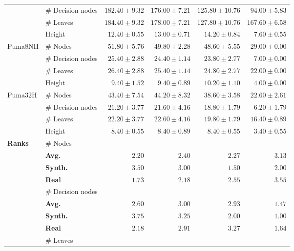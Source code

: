 \begin{table*}[!htbp]
{\begin{tabular}{llrrrr}
		  & \# Decision nodes & $182.40 \pm 9.32$ & $176.00 \pm 7.21$ & $125.80 \pm 10.76$ & $\mathbf{94.00 \pm 5.83}$\\
		  & \# Leaves & $184.40 \pm 9.32$ & $178.00 \pm 7.21$ & $\mathbf{127.80 \pm 10.76}$ & $167.60 \pm 6.58$\\
		  & Height & $12.40 \pm 0.55$ & $13.00 \pm 0.71$ & $14.20 \pm 0.84$ & $\mathbf{7.60 \pm 0.55}$\\
		\midrule
		\multirow{4}{*}{Puma8NH} & \# Nodes & $51.80 \pm 5.76$ & $49.80 \pm 2.28$ & $48.60 \pm 5.55$ & $\mathbf{29.00 \pm 0.00}$\\
		  & \# Decision nodes & $25.40 \pm 2.88$ & $24.40 \pm 1.14$ & $23.80 \pm 2.77$ & $\mathbf{7.00 \pm 0.00}$\\
		  & \# Leaves & $26.40 \pm 2.88$ & $25.40 \pm 1.14$ & $24.80 \pm 2.77$ & $\mathbf{22.00 \pm 0.00}$\\
		  & Height & $9.40 \pm 1.52$ & $9.40 \pm 0.89$ & $10.20 \pm 1.10$ & $\mathbf{4.00 \pm 0.00}$\\
		\midrule
		\multirow{4}{*}{Puma32H} & \# Nodes & $43.40 \pm 7.54$ & $44.20 \pm 8.32$ & $38.60 \pm 3.58$ & $\mathbf{22.60 \pm 2.61}$\\
		  & \# Decision nodes & $21.20 \pm 3.77$ & $21.60 \pm 4.16$ & $18.80 \pm 1.79$ & $\mathbf{6.20 \pm 1.79}$\\
		  & \# Leaves & $22.20 \pm 3.77$ & $22.60 \pm 4.16$ & $19.80 \pm 1.79$ & $\mathbf{16.40 \pm 0.89}$\\
		  & Height & $8.40 \pm 0.55$ & $8.40 \pm 0.89$ & $8.40 \pm 0.55$ & $\mathbf{3.40 \pm 0.55}$\\
		\midrule
		\multirow{16}{*}{\textbf{Ranks}}		 & \# Nodes &  &  &  & \\
		 & \qquad\textbf{Avg.} & $\mathbf{2.20}$ & $2.40$ & $2.27$ & $3.13$\\
		 & \qquad\textbf{Synth.} &  $3.50$ &  $3.00$ &  $\mathbf{1.50}$ &  $2.00$\\
		 & \qquad\textbf{Real} &  $\mathbf{1.73}$ & $2.18$ & $2.55$ & $3.55$\\
		\cmidrule{2-6}
		 & \# Decision nodes &  &  &  & \\
		 & \qquad\textbf{Avg.} & $2.60$ & $3.00$ & $2.93$ & $\mathbf{1.47}$\\
		 & \qquad\textbf{Synth.} &  $3.75$ &  $3.25$ &  $2.00$ &  $\mathbf{1.00}$\\
		 & \qquad\textbf{Real} & $2.18$ & $2.91$ & $3.27$ &  $\mathbf{1.64}$\\
		\cmidrule{2-6}
		 & \# Leaves &  &  &  & \\

\end{tabular}}
\end{table*}
